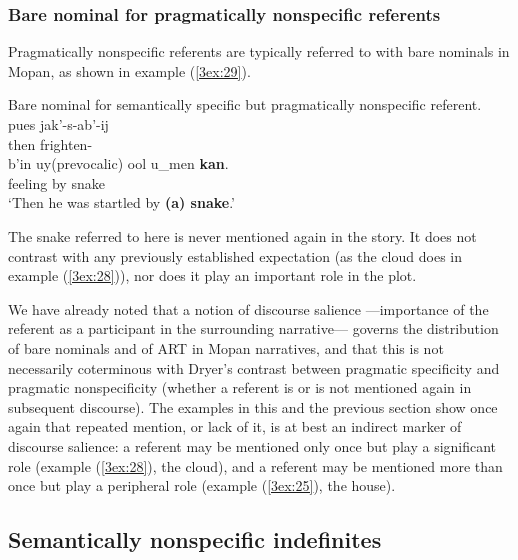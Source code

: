 \documentclass[output=paper]{langsci/langscibook}
\begin{document}
\subsubsection{Bare nominal for pragmatically nonspecific referents}\label{3sec:344}

Pragmatically nonspecific referents are typically referred to with bare nominals in Mopan, as shown in example (\ref{3ex:29}).

\begin{exe}
\ex\label{3ex:29}
{Bare nominal for semantically specific but pragmatically nonspecific referent.} 
\exi{}
\gll	pues		jak'-s-ab'-ij \\
	then		frighten-{} \\
\glt
\exi{}
\gll 	b'in		uy(prevocalic)		ool 		u\_men	{\bf{kan}}.  \\
	{}	{} 			feeling	by 		snake \\
\glt	`Then he was startled by {\bf{(a) snake}}.'
\end{exe}

The snake referred to here is never mentioned again in the story.  It does not contrast with any previously established expectation (as the cloud does in example (\ref{3ex:28})), nor does it play an important role in the plot.

We have already noted that a notion of discourse salience ---importance of the referent as a participant in the surrounding narrative--- governs the distribution of bare nominals and of ART in Mopan narratives, and that this is not necessarily coterminous with Dryer's contrast between pragmatic specificity and pragmatic nonspecificity (whether a referent is or is not mentioned again in subsequent discourse). The examples in this and the previous section show once again that repeated mention, or lack of it, is at best an indirect marker of discourse salience: a referent may be mentioned only once but play a significant role (example (\ref{3ex:28}), the cloud), and a referent may be mentioned more than once but play a peripheral role (example (\ref{3ex:25}), the house).

\subsection{Semantically nonspecific indefinites}\label{3sec:35}
\end{document}
